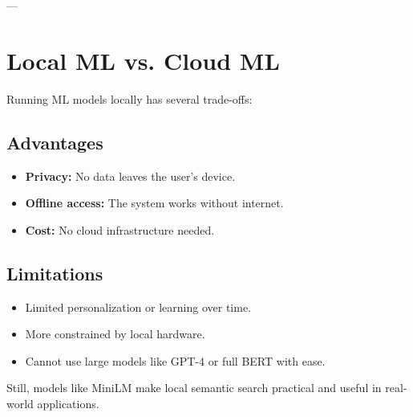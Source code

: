 ---

\section{Local ML vs. Cloud ML}
\label{sec:theory-localcloud}

Running ML models locally has several trade-offs:

\subsection*{Advantages}
\begin{itemize}
    \item \textbf{Privacy:} No data leaves the user's device.
    \item \textbf{Offline access:} The system works without internet.
    \item \textbf{Cost:} No cloud infrastructure needed.
\end{itemize}

\subsection*{Limitations}
\begin{itemize}
    \item Limited personalization or learning over time.
    \item More constrained by local hardware.
    \item Cannot use large models like GPT-4 or full BERT with ease.
\end{itemize}

Still, models like MiniLM make local semantic search practical and useful in real-world applications.
    